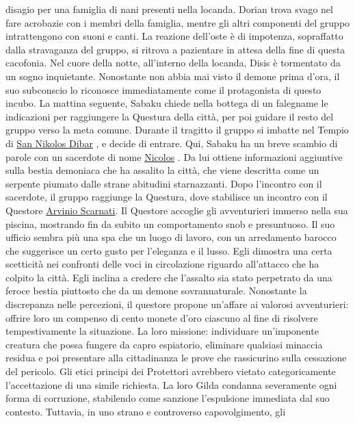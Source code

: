 disagio per una famiglia di nani presenti nella locanda. Dorian trova
svago nel fare acrobazie con i membri della famiglia, mentre gli altri
componenti del gruppo intrattengono con suoni e canti. La reazione
dell'oste è di impotenza, sopraffatto dalla stravaganza del gruppo, si
ritrova a pazientare in attesa della fine di questa cacofonia. Nel cuore
della notte, all'interno della locanda, Disis è tormentato da un sogno
inquietante. Nonostante non abbia mai visto il demone prima d'ora, il
suo subconscio lo riconosce immediatamente come il protagonista di
questo incubo. La mattina seguente, Sabaku chiede nella bottega di un
falegname le indicazioni per raggiungere la Questura della città, per
poi guidare il resto del gruppo verso la meta comune. Durante il
tragitto il gruppo si imbatte nel Tempio di
\href{San\%20Nikolos\%20Dibar\%2025d750713dba4816a1b6771821ab3187.md}{San
Nikolos Dibar} , e decide di entrare. Qui, Sabaku ha un breve scambio di
parole con un sacerdote di nome
\href{Nicolos\%20fac31cf73d3d4b70b068ab976e2129e1.md}{Nicolos} . Da lui
ottiene informazioni aggiuntive sulla bestia demoniaca che ha assalito
la città, che viene descritta come un serpente piumato dalle strane
abitudini starnazzanti. Dopo l'incontro con il sacerdote, il gruppo
raggiunge la Questura, dove stabilisce un incontro con il Questore
\href{Arvinio\%20Scarnati\%209ff14cda64684ea88c6772adc5b63f01.md}{Arvinio
Scarnati}. Il Questore accoglie gli avventurieri immerso nella sua
piscina, mostrando fin da subito un comportamento snob e presuntuoso. Il
suo ufficio sembra più una spa che un luogo di lavoro, con un
arredamento barocco che suggerisce un certo gusto per l'eleganza e il
lusso. Egli dimostra una certa scetticità nei confronti delle voci in
circolazione riguardo all'attacco che ha colpito la città. Egli inclina
a credere che l'assalto sia stato perpetrato da una feroce bestia
piuttosto che da un demone sovrannaturale. Nonostante la discrepanza
nelle percezioni, il questore propone un'affare ai valorosi
avventurieri: offrire loro un compenso di cento monete d'oro ciascuno al
fine di risolvere tempestivamente la situazione. La loro missione:
individuare un'imponente creatura che possa fungere da capro espiatorio,
eliminare qualsiasi minaccia residua e poi presentare alla cittadinanza
le prove che rassicurino sulla cessazione del pericolo. Gli etici
principi dei Protettori avrebbero vietato categoricamente l'accettazione
di una simile richiesta. La loro Gilda condanna severamente ogni forma
di corruzione, stabilendo come sanzione l'espulsione immediata dal suo
contesto. Tuttavia, in uno strano e controverso capovolgimento, gli
